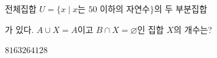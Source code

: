 전체집합 $U=\{x \mid x$는 $50$ 이하의 자연수$\}$의 두 부분집합 \par\smallskip{}\par\smallskip\noindent 가 있다. $A\cup X=A$이고 $B\cap X=\varnothing$인 집합 $X$의 개수는?
\begin{choices32}{$8$}{$16$}{$32$}{$64$}{$128$}\end{choices32}
